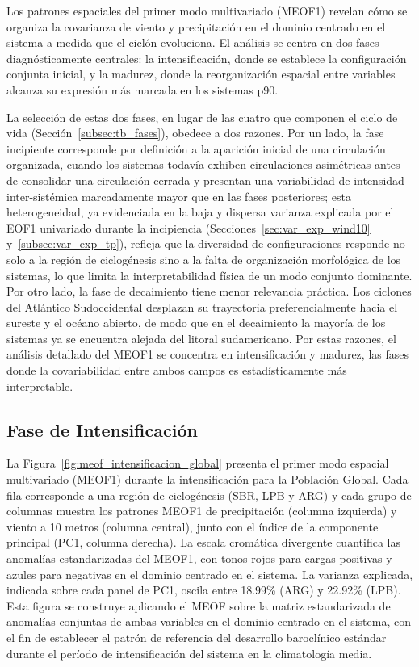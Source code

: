 Los patrones espaciales del primer modo multivariado (MEOF1) revelan cómo se organiza la covarianza de viento y precipitación en el dominio centrado en el sistema a medida que el ciclón evoluciona.
El análisis se centra en dos fases diagnósticamente centrales: la intensificación, donde se establece la configuración conjunta inicial, y la madurez, donde la reorganización espacial entre variables alcanza su expresión más marcada en los sistemas p90.

La selección de estas dos fases, en lugar de las cuatro que componen el ciclo de vida (Sección~\ref{subsec:tb_fases}), obedece a dos razones.
Por un lado, la fase incipiente corresponde por definición a la aparición inicial de una circulación organizada, cuando los sistemas todavía exhiben circulaciones asimétricas antes de consolidar una circulación cerrada y presentan una variabilidad de intensidad inter-sistémica marcadamente mayor que en las fases posteriores; esta heterogeneidad, ya evidenciada en la baja y dispersa varianza explicada por el EOF1 univariado durante la incipiencia (Secciones~\ref{sec:var_exp_wind10} y~\ref{subsec:var_exp_tp}), refleja que la diversidad de configuraciones responde no solo a la región de ciclogénesis sino a la falta de organización morfológica de los sistemas, lo que limita la interpretabilidad física de un modo conjunto dominante.
Por otro lado, la fase de decaimiento tiene menor relevancia práctica. Los ciclones del Atlántico Sudoccidental desplazan su trayectoria preferencialmente hacia el sureste y el océano abierto, de modo que en el decaimiento la mayoría de los sistemas ya se encuentra alejada del litoral sudamericano.
Por estas razones, el análisis detallado del MEOF1 se concentra en intensificación y madurez, las fases donde la covariabilidad entre ambos campos es estadísticamente más interpretable.

\subsection{Fase de Intensificación}
\label{subsec:meof_intensificacion}

La Figura~\ref{fig:meof_intensificacion_global} presenta el primer modo espacial multivariado (MEOF1) durante la intensificación para la Población Global.
Cada fila corresponde a una región de ciclogénesis (SBR, LPB y ARG) y cada grupo de columnas muestra los patrones MEOF1 de precipitación (columna izquierda) y viento a 10 metros (columna central), junto con el índice de la componente principal (PC1, columna derecha).
La escala cromática divergente cuantifica las anomalías estandarizadas del MEOF1, con tonos rojos para cargas positivas y azules para negativas en el dominio centrado en el sistema. La varianza explicada, indicada sobre cada panel de PC1, oscila entre 18.99\% (ARG) y 22.92\% (LPB).
Esta figura se construye aplicando el MEOF sobre la matriz estandarizada de anomalías conjuntas de ambas variables en el dominio centrado en el sistema, con el fin de establecer el patrón de referencia del desarrollo baroclínico estándar durante el período de intensificación del sistema en la climatología media.

